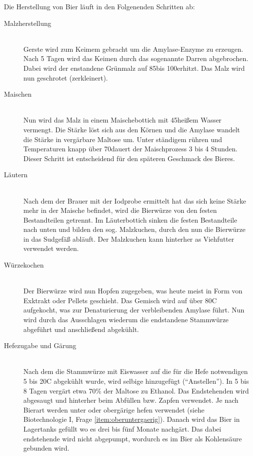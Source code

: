 \begin{enumerate}
		Die Herstellung von Bier läuft in den Folgenenden Schritten ab:
		\begin{description}
			\item[Malzherstellung] \hfill \\
				Gerste wird zum Keimem gebracht um die Amylase-Enzyme zu erzeugen.
				Nach 5 Tagen wird das Keimen durch das sogenannte Darren abgebrochen.
				Dabei wird der enstandene Grünmalz auf 85\textdegree bis 100\textdegree erhitzt.
				Das Malz wird nun geschrotet (zerkleinert).
			\item[Maischen] \hfill \\
				Nun wird das Malz in einem Maischebottich mit 45\textdegree heißem Wasser vermengt.
				Die Stärke löst sich aus den Körnen und die Amylase wandelt die Stärke in vergärbare Maltose um.
				Unter ständigem rühren und Temperaturen knapp über 70\textdegree dauert der Maischprozess 3 bis 4 Stunden.
				Dieser Schritt ist entscheidend für den späteren Geschmack des Bieres.
			\item[Läutern] \hfill \\
				Nach dem der Brauer mit der Iodprobe ermittelt hat das sich keine Stärke mehr in der Maische befindet,
				wird die Bierwürze von den festen Bestandteilen getrennt.
				Im Läuterbottich sinken die festen Bestandteile nach unten und bilden den sog. Malzkuchen,
				durch den nun die Bierwürze in das Sudgefäß abläuft.
				Der Malzkuchen kann hinterher as Viehfutter verwendet werden.
			\item[Würzekochen] \hfill \\
				Der Bierwürze wird nun Hopfen zugegeben,
				was heute meist in Form von Exktrakt oder Pellets geschieht.
				Das Gemisch wird auf über 80\textdegree C aufgekocht,
				was zur Denaturierung der verbleibenden Amylase führt.
				Nun wird durch das Ausschlagen wiederum die endstandene Stammwürze abgeführt und
				anschließend abgekühlt.
			\item[Hefezugabe und Gärung] \hfill \\
				Nach dem die Stammwürze mit Eiswasser auf die für die Hefe notwendigen 5 bis 20\textdegree C abgekühlt wurde,
				wird selbige hinzugefügt (``Anstellen'').
				In 5 bis 8 Tagen vergärt etwa 70\% der Maltose zu Ethanol.
				Das Endstehenden  wird abgesaugt und hinterher beim Abfüllen bzw. Zapfen verwendet.
				Je nach Bierart werden unter oder obergärige hefen verwendet (siehe Biotechnologie I, Frage \ref{item:oberuntergaerig}).
				Danach wird das Bier in Lagertanks gefüllt wo es drei bis fünf Monate nachgärt.
				Das dabei endstehende  wird nicht abgepumpt,
				wordurch es im Bier als Kohlensäure gebunden wird.
		\end{description}
			

\end{enumerate}
